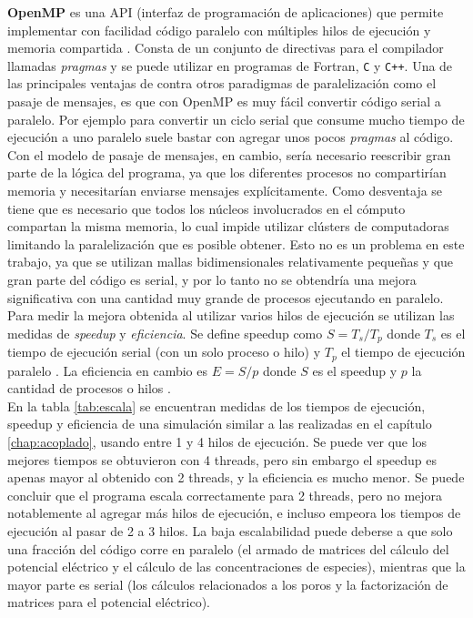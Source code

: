 \textbf{OpenMP} es una API (interfaz de programación de aplicaciones) que permite implementar con facilidad código paralelo con múltiples hilos de ejecución y memoria compartida \cite{quinn}. Consta de un conjunto de directivas para el compilador llamadas \textit{pragmas} y se puede utilizar en programas de Fortran, \texttt{C} y \texttt{C++}. Una de las principales ventajas de  contra otros paradigmas de paralelización como el pasaje de mensajes, es que con OpenMP es muy fácil convertir código serial a paralelo. Por ejemplo para convertir un ciclo serial que consume mucho tiempo de ejecución a uno paralelo suele bastar con agregar unos pocos \textit{pragmas} al código. Con el modelo de pasaje de mensajes, en cambio, sería necesario reescribir gran parte de la lógica del programa, ya que los diferentes procesos no compartirían memoria y necesitarían enviarse mensajes explícitamente. Como desventaja se tiene que es necesario que todos los núcleos involucrados en el cómputo compartan la misma memoria, lo cual impide utilizar clústers de computadoras limitando la paralelización que es posible obtener. Esto no es un problema en este trabajo, ya que se utilizan mallas bidimensionales relativamente pequeñas y que gran parte del código es serial, y por lo tanto no se obtendría una mejora significativa con una cantidad muy grande de procesos ejecutando en paralelo.\\


Para medir la mejora obtenida al utilizar varios hilos de ejecución se utilizan las medidas de \textit{speedup} y \textit{eficiencia}. Se define speedup como $S = T_s / T_p$ donde $T_s$ es el tiempo de ejecución serial (con un solo proceso o hilo) y $T_p$ el tiempo de ejecución paralelo \cite{pacheco}. La eficiencia en cambio es $E = S / p$ donde $S$ es el speedup y $p$ la cantidad de procesos o hilos \cite{pacheco}.\\

En la tabla \ref{tab:escala} se encuentran medidas de los tiempos de ejecución, speedup y eficiencia de una simulación similar a las realizadas en el capítulo \ref{chap:acoplado}, usando entre 1 y 4 hilos de ejecución. Se puede ver que los mejores tiempos se obtuvieron con 4 threads, pero sin embargo el speedup es apenas mayor al obtenido con 2 threads, y la eficiencia es mucho menor. Se puede concluir que el programa escala correctamente para 2 threads, pero no mejora notablemente al agregar más hilos de ejecución, e incluso empeora los tiempos de ejecución al pasar de 2 a 3 hilos. La baja escalabilidad puede deberse a que solo una fracción del código corre en paralelo (el armado de matrices del cálculo del potencial eléctrico y el cálculo de las concentraciones de especies), mientras que la mayor parte es serial (los cálculos relacionados a los poros y la factorización de matrices para el potencial eléctrico).

